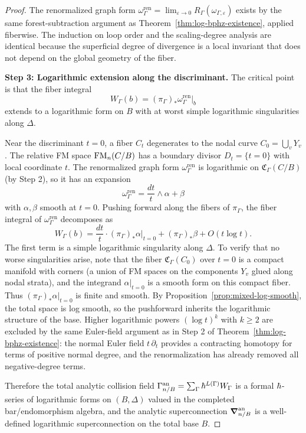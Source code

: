 \begin{proof}
The renormalized graph form $\omega_\Gamma^{\mathrm{ren}} = \lim_{\varepsilon \to 0} R_\Gamma(\omega_{\Gamma,\varepsilon})$ exists by the same forest-subtraction argument as Theorem~\ref{thm:log-bphz-existence}, applied fiberwise. The induction on loop order and the scaling-degree analysis are identical because the superficial degree of divergence is a local invariant that does not depend on the global geometry of the fiber.

\medskip
\textbf{Step 3: Logarithmic extension along the discriminant.}
The critical point is that the fiber integral
\[
 W_\Gamma(b) = (\pi_\Gamma)_*\omega_\Gamma^{\mathrm{ren}}\big|_b
\]
extends to a logarithmic form on $B$ with at worst simple logarithmic singularities along $\Delta$.

Near the discriminant $t = 0$, a fiber $C_t$ degenerates to the nodal curve $C_0 = \bigcup_v Y_v$. The relative FM space $\mathrm{FM}_n(C/B)$ has a boundary divisor $D_t = \{t = 0\}$ with local coordinate $t$. The renormalized graph form $\omega_\Gamma^{\mathrm{ren}}$ is logarithmic on $\mathfrak C_\Gamma(C/B)$ (by Step 2), so it has an expansion
\[
 \omega_\Gamma^{\mathrm{ren}} = \frac{dt}{t} \wedge \alpha + \beta
\]
with $\alpha, \beta$ smooth at $t = 0$. Pushing forward along the fibers of $\pi_\Gamma$, the fiber integral of $\omega_\Gamma^{\mathrm{ren}}$ decomposes as
\[
 W_\Gamma(b) = \frac{dt}{t} \cdot (\pi_\Gamma)_* \alpha\big|_{t=0} + (\pi_\Gamma)_* \beta + O(t \log t).
\]
The first term is a simple logarithmic singularity along $\Delta$. To verify that no worse singularities arise, note that the fiber $\mathfrak C_\Gamma(C_0)$ over $t = 0$ is a compact manifold with corners (a union of FM spaces on the components $Y_v$ glued along nodal strata), and the integrand $\alpha|_{t=0}$ is a smooth form on this compact fiber. Thus $(\pi_\Gamma)_* \alpha|_{t=0}$ is finite and smooth. By Proposition~\ref{prop:mixed-log-smooth}, the total space is log smooth, so the pushforward inherits the logarithmic structure of the base. Higher logarithmic powers $(\log t)^k$ with $k \ge 2$ are excluded by the same Euler-field argument as in Step 2 of Theorem~\ref{thm:log-bphz-existence}: the normal Euler field $t\, \partial_t$ provides a contracting homotopy for terms of positive normal degree, and the renormalization has already removed all negative-degree terms.

Therefore the total analytic collision field $\Gamma_{n/B}^{\mathrm{an}} = \sum_\Gamma \hbar^{L(\Gamma)} W_\Gamma$ is a formal $\hbar$-series of logarithmic forms on $(B, \Delta)$ valued in the completed bar/endomorphism algebra, and the analytic superconnection $\boldsymbol{\nabla}_{n/B}^{\mathrm{an}}$ is a well-defined logarithmic superconnection on the total base $B$.


\end{proof}
